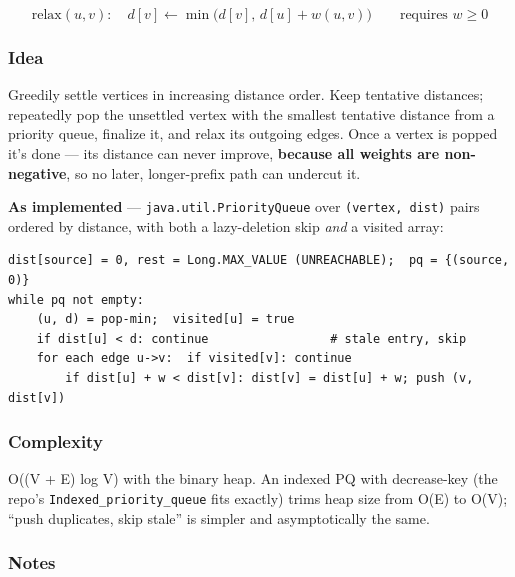 \documentclass[
  10pt,
  letterpaper,
  onecolumn]{article}
\begin{document}
\begin{equation*}
\text{relax}(u,v):\quad d[v]\leftarrow\min\bigl(d[v],\,d[u]+w(u,v)\bigr)
\qquad\text{requires } w\ge 0
\end{equation*}

\hypertarget{idea-17}{%
\subsubsection{Idea}\label{idea-17}}

Greedily settle vertices in increasing distance order. Keep tentative
distances; repeatedly pop the unsettled vertex with the smallest
tentative distance from a priority queue, finalize it, and relax its
outgoing edges. Once a vertex is popped it's done --- its distance can
never improve, \textbf{because all weights are non-negative}, so no
later, longer-prefix path can undercut it.

\textbf{As implemented} --- \texttt{java.util.PriorityQueue} over
\texttt{(vertex,\ dist)} pairs ordered by distance, with both a
lazy-deletion skip \emph{and} a visited array:

\begin{verbatim}
dist[source] = 0, rest = Long.MAX_VALUE (UNREACHABLE);  pq = {(source, 0)}
while pq not empty:
    (u, d) = pop-min;  visited[u] = true
    if dist[u] < d: continue                 # stale entry, skip
    for each edge u->v:  if visited[v]: continue
        if dist[u] + w < dist[v]: dist[v] = dist[u] + w; push (v, dist[v])
\end{verbatim}

\hypertarget{complexity-17}{%
\subsubsection{Complexity}\label{complexity-17}}

O((V + E) log V) with the binary heap. An indexed PQ with decrease-key
(the repo's \texttt{Indexed\_priority\_queue} fits exactly) trims heap
size from O(E) to O(V); ``push duplicates, skip stale'' is simpler and
asymptotically the same.

\hypertarget{notes-16}{%
\subsubsection{Notes}\label{notes-16}}
\end{document}
